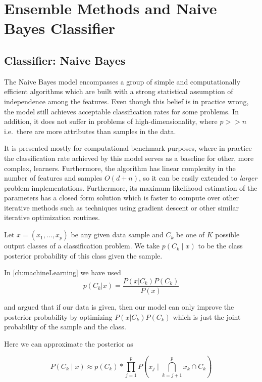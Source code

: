 \chapter{Ensemble Methods and  Naive Bayes Classifier}\label{cha:ensembleMethods}


\section{Classifier: Naive Bayes}

The Naive Bayes model encompasses a group of simple and computationally efficient algorithms which are built with a strong statistical assumption of independence among the features. Even though this belief is in practice wrong, the model still achieves acceptable classification rates for some problems. In addition, it does not suffer in problems of high-dimensionality, where $p >> n$ i.e.\ there are more attributes than samples in the data.

It is presented mostly for computational benchmark purposes, where in practice the classification rate achieved by this model serves as a baseline for other, more complex, learners. Furthermore, the algorithm has linear complexity in the number of features and samples $O(d+n)$, so it can be easily extended to \textit{larger} problem implementations. Furthermore, its maximum-likelihood estimation of the parameters has a closed form solution which is faster to compute over other iterative methods such as techniques using gradient descent or other similar iterative optimization routines.

Let $x = (x_1,\ldots,x_p)$ be any given data sample and $C_k$ be one of $K$ possible output classes of a classification problem. We take $p(C_k \mid x)$ to be the class posterior probability of this class given the sample.

In \cref{ch:machineLearning}
we have used
\begin{equation}
p(C_k| x) = \frac{P(x|C_k)P(C_k)}{P(x)}
\end{equation}\label{eq:equation-posteriorProbabilties}


and argued that if our data is given, then our model can only improve the posterior probability by optimizing $P(x|C_k)P(C_k)$ which is just the joint probability of the sample and the class.

Here we can approximate the posterior as

\begin{equation}
P(C_k \mid x) \approx p(C_k) * \prod_{j=1}^{p}  P(x_j \mid \bigcap_{k=j+1}^{p} x_k \cap C_k)
\end{equation}\label{eq:posteriorProbabilityDecomposition1}


